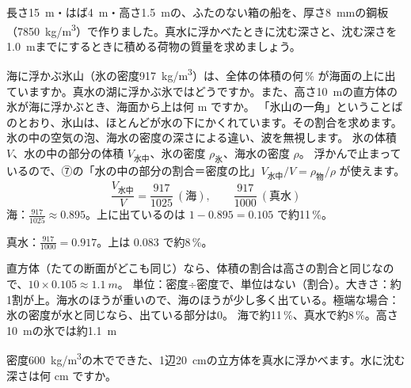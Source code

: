 \begin{jibun}
長さ\qty{15}{m}・はば\qty{4}{m}・高さ\qty{1.5}{m}の、ふたのない箱の船を、厚さ\qty{8}{mm}の鋼板（\qty{7850}{kg/m^3}）で作りました。真水に浮かべたときに沈む深さと、沈む深さを\qty{1.0}{m}までにするときに積める荷物の質量を求めましょう。
\end{jibun}

\begin{phreidai}[氷山の一角]
\label{ph:力-12:ex10}海に浮かぶ氷山（氷の密度\qty{917}{kg/m^3}）は、全体の体積の何\,\% が海面の上に出ていますか。真水の湖に浮かぶ氷ではどうですか。また、高さ\qty{10}{m}の直方体の氷が海に浮かぶとき、海面から上は何 m ですか。
\phbamen
「氷山の一角」ということばのとおり、氷山は、ほとんどが水の下にかくれています。その割合を求めます。
\phmushi
氷の中の空気の泡、海水の密度の深さによる違い、波を無視します。
\phzu
氷の体積 $V$、水の中の部分の体積 $V_{\text{水中}}$、氷の密度 $\rho_{\text{氷}}$、海水の密度 $\rho$。
\phriyu
浮かんで止まっているので、⑦の「水の中の部分の割合＝密度の比」$V_{\text{水中}}/V=\rho_{\text{物}}/\rho$ が使えます。
\phtateru
\[ \frac{V_{\text{水中}}}{V}=\frac{917}{1025}\ (\text{海}),\qquad \frac{917}{1000}\ (\text{真水}) \]
\phtoku
海：$\tfrac{917}{1025}\approx0.895$。上に出ているのは $1-0.895=0.105$ で約11\,\%。\par
真水：$\tfrac{917}{1000}=0.917$。上は $0.083$ で約8\,\%。\par
直方体（たての断面がどこも同じ）なら、体積の割合は高さの割合と同じなので、$10\times0.105\approx\qty{1.1}{m}$。
\phtashikame
単位：密度÷密度で、単位はない（割合）。大きさ：約1割が上。海水のほうが重いので、海のほうが少し多く出ている。極端な場合：氷の密度が水と同じなら、出ている部分は0。
\kotae 海で約11\,\%、真水で約8\,\%。高さ\qty{10}{m}の氷では約\qty{1.1}{m}
\end{phreidai}
\begin{jibun}
密度\qty{600}{kg/m^3}の木でできた、1辺\qty{20}{cm}の立方体を真水に浮かべます。水に沈む深さは何 cm ですか。
\end{jibun}

